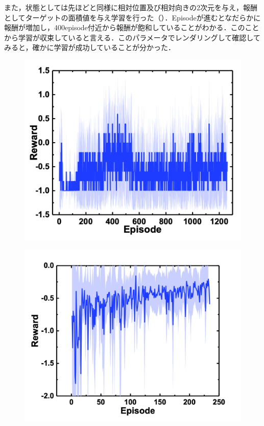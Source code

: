 また，状態としては先ほどと同様に相対位置及び相対向きの2次元を与え，報酬としてターゲットの面積値を与え学習を行った（）．Episodeが進むとなだらかに報酬が増加し，400episode付近から報酬が飽和していることがわかる．このことから学習が収束していると言える．このパラメータでレンダリングして確認してみると，確かに学習が成功していることが分かった．

\begin{figure}[H]
    \centering
    \begin{minipage}{0.4\linewidth}
        \centering
        \includegraphics[width=0.9\linewidth]{figure/chapter3/rew=01_obs=面積重心_origin}
        \label{fig:報酬離散}
    \end{minipage}
    \hspace{5mm}
    \begin{minipage}{0.4\linewidth}
        \centering
        \includegraphics[width=0.9\linewidth]{figure/chapter3/QL_rew=distance_obs=posvec_origin}

\end{minipage}
\end{figure}
